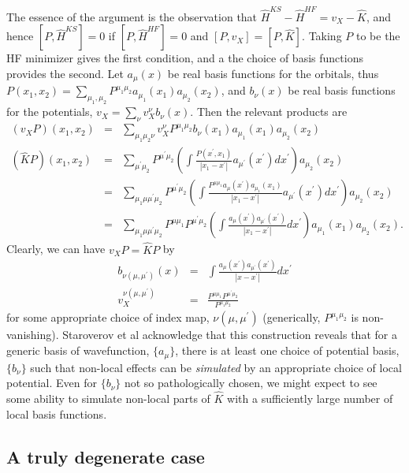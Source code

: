 \documentclass{article}
\newcommand{\beas}{\begin{eqnarray*}}
\newcommand{\enas}{\end{eqnarray*}}
\newcommand{\paren}[1]{\left({#1}\right)}
\newcommand{\brparen}[1]{\left[{#1}\right]}
\begin{document}
The essence of the argument is the observation that
$\hat{H}^{KS} -  \hat{H}^{HF} = v_X - \hat{K}$, and hence
$\brparen{P, \hat{H}^{KS}} = 0$ if 
$\brparen{ P , \hat{H}^{HF} } = 0$ and
$\brparen{ P, v_X } = \brparen{ P, \hat{K} }$.
Taking $P$ to be the HF minimizer gives the first condition,
and a the choice of basis functions provides the second.
Let $a_\mu(x)$ be real basis functions for the orbitals, thus
$P(x_1,x_2) = \sum_{\mu_1,\mu_2} P^{\mu_1\mu_2} a_{\mu_1}(x_1) a_{\mu_2}(x_2)$,
and $b_{\nu}(x)$ be real basis functions for the potentials,
$v_X = \sum_{\nu} v^\nu_{X} b_{\nu}(x)$.  Then the relevant products are
\beas
  (v_X P)(x_1,x_2) &=& \sum_{\mu_1 \mu_2 \nu} v^\nu_{X} P^{\mu_1\mu_2}
              b_{\nu}(x_1) a_{\mu_1}(x_1) a_{\mu_2}(x_2)\\
  (\hat{K} P)(x_1,x_2) &=&
      \sum_{\mu^\prime \mu_2} P^{\mu^\prime \mu_2}
     \paren{ \int \frac{P(x^\prime,x_1)}{|x_1-x^\prime|} a_{\mu^\prime}(x^\prime) dx^\prime }
     a_{\mu_2}(x_2)\\
 &=&
      \sum_{\mu_1 \mu \mu^\prime \mu_2} P^{\mu^\prime \mu_2}
     \paren{ \int \frac{ P^{\mu \mu_1} a_{\mu}(x^\prime) a_{\mu_1}(x_1) }{|x_1-x^\prime|} a_{\mu^\prime}(x^\prime) dx^\prime }
     a_{\mu_2}(x_2)\\
 &=&
      \sum_{\mu_1 \mu \mu^\prime \mu_2}  P^{\mu \mu_1} P^{\mu^\prime \mu_2}
     \paren{ \int \frac{ a_{\mu}(x^\prime)a_{\mu^\prime}(x^\prime) }{|x_1-x^\prime|} dx^\prime }
     a_{\mu_1}(x_1) a_{\mu_2}(x_2).
\enas
Clearly, we can have $v_X P = \hat{K} P$ by
\beas
b_{\nu(\mu,\mu^\prime)}(x) 
&=& \int \frac{ a_{\mu}(x^\prime)a_{\mu^\prime}(x^\prime) }{|x-x^\prime|}
   dx^\prime\\
v^{\nu(\mu,\mu^\prime)}_{X}
 &=& \frac{P^{\mu \mu_1} P^{\mu^\prime \mu_2}}
          {P^{\mu_1 \mu_2}}
\enas
for some appropriate choice of index map, $\nu(\mu,\mu^\prime)$
(generically, $P^{\mu_1\mu_2}$ is non-vanishing).
Staroverov et al acknowledge that this construction reveals that
for a generic basis of wavefunction, $\{a_\mu\}$, there is at least
one choice of potential basis, $\{ b_{\nu} \}$ such that non-local
effects can be {\em simulated} by an appropriate choice of local potential.
Even for $\{ b_{\nu} \}$ not so pathologically chosen, we might expect
to see some ability to simulate non-local parts of $\hat{K}$ with
a sufficiently large number of local basis functions.


\subsection{A truly degenerate case}
\end{document}
